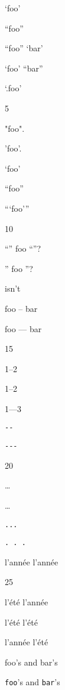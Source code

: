 
\def\mytitle{Smart Quotes}


`foo'

``foo''

``foo'' `bar'

`foo' ``bar''

`.foo'

5

"foo".

'foo'.

`foo'

``foo''

```foo'''

10

``'' foo ``''?

'' foo ''?

isn't

foo -- bar

foo --- bar

15

1--2

1--2

1---3

\texttt{-{}-}

\texttt{-{}-{}-}

20

{\ldots}

{\ldots}

\texttt{...}

\texttt{. . .}

l'année l'année

25

l'été l'année

l'été l'été

l'année l'été

foo's and bar's

\texttt{foo}'s and \texttt{bar}'s



